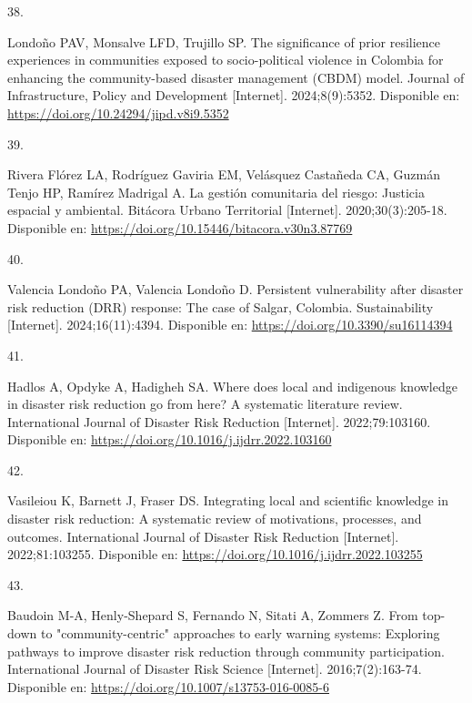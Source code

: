 \documentclass[
  spanish,
  letterpaper,
]{book}
\newlength{\cslhangindent}
\newlength{\csllabelwidth}
\newenvironment{CSLReferences}[2] %
 {\begin{list}{}{%
  \setlength{\itemindent}{0pt}
  \setlength{\leftmargin}{0pt}
  \setlength{\parsep}{0pt}
  \ifodd #1
   \setlength{\leftmargin}{\cslhangindent}
   \setlength{\itemindent}{-1\cslhangindent}
  \fi
  \setlength{\itemsep}{#2\baselineskip}}}
 {\end{list}}
\newcommand{\CSLLeftMargin}[1]{\parbox[t]{\csllabelwidth}{\strut#1\strut}}
\newcommand{\CSLRightInline}[1]{\parbox[t]{\linewidth - \csllabelwidth}{\strut#1\strut}}
\begin{document}
\begin{CSLReferences}{0}{1}
\CSLLeftMargin{38. }%
\CSLRightInline{Londoño PAV, Monsalve LFD, Trujillo SP. The significance
of prior resilience experiences in communities exposed to
socio-political violence in Colombia for enhancing the community-based
disaster management (CBDM) model. Journal of Infrastructure, Policy and
Development {[}Internet{]}. 2024;8(9):5352. Disponible en:
\url{https://doi.org/10.24294/jipd.v8i9.5352}}

\CSLLeftMargin{39. }%
\CSLRightInline{Rivera Flórez LA, Rodríguez Gaviria EM, Velásquez
Castañeda CA, Guzmán Tenjo HP, Ramírez Madrigal A. La gestión
comunitaria del riesgo: Justicia espacial y ambiental. Bitácora Urbano
Territorial {[}Internet{]}. 2020;30(3):205-18. Disponible en:
\url{https://doi.org/10.15446/bitacora.v30n3.87769}}

\CSLLeftMargin{40. }%
\CSLRightInline{Valencia Londoño PA, Valencia Londoño D. Persistent
vulnerability after disaster risk reduction (DRR) response: The case of
Salgar, Colombia. Sustainability {[}Internet{]}. 2024;16(11):4394.
Disponible en: \url{https://doi.org/10.3390/su16114394}}

\CSLLeftMargin{41. }%
\CSLRightInline{Hadlos A, Opdyke A, Hadigheh SA. Where does local and
indigenous knowledge in disaster risk reduction go from here? A
systematic literature review. International Journal of Disaster Risk
Reduction {[}Internet{]}. 2022;79:103160. Disponible en:
\url{https://doi.org/10.1016/j.ijdrr.2022.103160}}

\CSLLeftMargin{42. }%
\CSLRightInline{Vasileiou K, Barnett J, Fraser DS. Integrating local and
scientific knowledge in disaster risk reduction: A systematic review of
motivations, processes, and outcomes. International Journal of Disaster
Risk Reduction {[}Internet{]}. 2022;81:103255. Disponible en:
\url{https://doi.org/10.1016/j.ijdrr.2022.103255}}

\CSLLeftMargin{43. }%
\CSLRightInline{Baudoin M-A, Henly-Shepard S, Fernando N, Sitati A,
Zommers Z. From top-down to "community-centric" approaches to early
warning systems: Exploring pathways to improve disaster risk reduction
through community participation. International Journal of Disaster Risk
Science {[}Internet{]}. 2016;7(2):163-74. Disponible en:
\url{https://doi.org/10.1007/s13753-016-0085-6}}

\end{CSLReferences}


\backmatter
\end{document}
